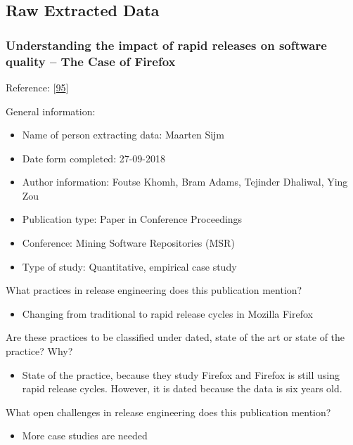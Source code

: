 \documentclass[]{book}
\providecommand{\tightlist}{%
  \setlength{\itemsep}{0pt}\setlength{\parskip}{0pt}}
\begin{document}
\subsection{Raw Extracted Data}\label{raw-extracted-data}

\subsubsection{Understanding the impact of rapid releases on software
quality -- The Case of
Firefox}\label{understanding-the-impact-of-rapid-releases-on-software-quality-the-case-of-firefox}

Reference: {[}\protect\hyperlink{ref-khomh2015a}{95}{]}

General information:

\begin{itemize}
\tightlist
\item
  Name of person extracting data: Maarten Sijm
\item
  Date form completed: 27-09-2018
\item
  Author information: Foutse Khomh, Bram Adams, Tejinder Dhaliwal, Ying
  Zou
\item
  Publication type: Paper in Conference Proceedings
\item
  Conference: Mining Software Repositories (MSR)
\item
  Type of study: Quantitative, empirical case study
\end{itemize}

What practices in release engineering does this publication mention?

\begin{itemize}
\tightlist
\item
  Changing from traditional to rapid release cycles in Mozilla Firefox
\end{itemize}

Are these practices to be classified under dated, state of the art or
state of the practice? Why?

\begin{itemize}
\tightlist
\item
  State of the practice, because they study Firefox and Firefox is still
  using rapid release cycles. However, it is dated because the data is
  six years old.
\end{itemize}

What open challenges in release engineering does this publication
mention?

\begin{itemize}
\tightlist
\item
  More case studies are needed
\end{itemize}
\end{document}
